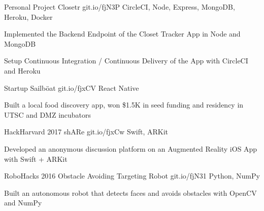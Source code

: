 \begin{cventries}
\cventry
    {Personal Project}
    {Closetr}
    {}
    {git.io/fjN3P}
    {CircleCI, Node, Express, MongoDB, Heroku, Docker}
    {
      \begin{cvitems}
        \item{Implemented the Backend Endpoint of the Closet Tracker App in Node and MongoDB}
        \item{Setup Continuous Integration / Continuous Delivery of the App with CircleCI and Heroku}
      \end{cvitems}
    }
\cventry
  {Startup}
  {Sailböat}
  {}
  {git.io/fjxCV}
  {React Native}
  {
    \begin{cvitems}
      \item {Built a local food discovery app, won \$1.5K in seed funding and residency in UTSC and DMZ incubators}
    \end{cvitems}
  }
\cventry
  {HackHarvard 2017}
  {shARe}
  {}
  {git.io/fjxCw}
  {Swift, ARKit}
  {
    \begin{cvitems}
      \item {Developed an anonymous discussion platform on an Augmented Reality iOS App with Swift + ARKit}
    \end{cvitems}
  }
\cventry
  {RoboHacks 2016}
  {Obstacle Avoiding Targeting Robot}
  {}
  {git.io/fjN31}
  {Python, NumPy}
  {
    \begin{cvitems}
      \item {Built an autonomous robot that detects faces and avoids obstacles with OpenCV and NumPy}
    \end{cvitems}
  }
\end{cventries}
